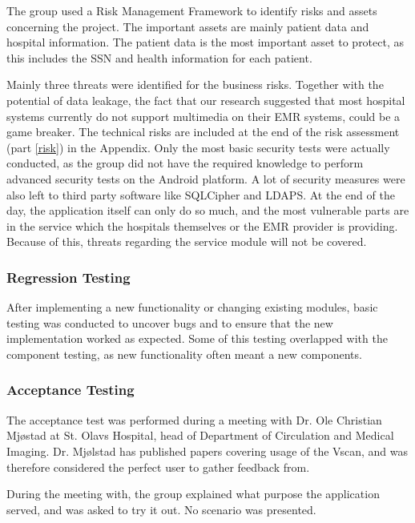 The group used a Risk Management Framework to identify risks and assets concerning the project. The important assets are mainly patient data and hospital information. The patient data is the most important asset to protect, as this includes the SSN and health information for each patient. 

Mainly three threats were identified for the business risks. Together with the potential of data leakage, the fact that our research suggested that most hospital systems currently do not support multimedia on their EMR systems, could be a game breaker. The technical risks are included at the end of the risk assessment (part \ref{risk}) in the Appendix.
\noindent
Only the most basic security tests were actually conducted, as the group did not have the required knowledge to perform advanced security tests on the Android platform. A lot of security measures were also left to third party software like SQLCipher and LDAPS. At the end of the day, the application itself can only do so much, and the most vulnerable parts are in the service which the hospitals themselves or the EMR provider is providing. Because of this, threats regarding the service module will not be covered.

\subsubsection{Regression Testing}

After implementing a new functionality or changing existing modules, basic testing was conducted to uncover bugs and to ensure that the new implementation worked as expected. Some of this testing overlapped with the component testing, as new functionality often meant a new components.

\subsubsection{Acceptance Testing}

The acceptance test was performed during a meeting with Dr. Ole Christian Mjøstad at St. Olavs Hospital, head of Department of Circulation and Medical Imaging. Dr. Mjølstad has published papers covering usage of the Vscan, and was therefore considered the perfect user to gather feedback from.

During the meeting with, the group explained what purpose the application served, and was asked to try it out. No scenario was presented.

